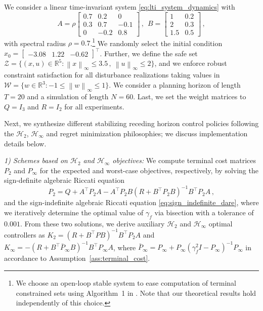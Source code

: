 \documentclass[conference]{IEEEtran}
\newcommand{\norm}[1]{\left\lVert#1\right\rVert}
\begin{document}
We consider a linear time-invariant system \eqref{eq:lti_system_dynamics} with
\begin{equation*}
    A = \rho \begin{bmatrix}
        0.7 & 0.2 & 0\\
        0.3 & 0.7 & -0.1\\
        0 & -0.2 & 0.8
    \end{bmatrix}\,, ~~
    B = \begin{bmatrix}
        1 & 0.2\\
        2 & 0.3\\
        1.5 & 0.5
    \end{bmatrix}\,,
\end{equation*}
with spectral radius $\rho = 0.7$.\footnote{We choose an open-loop stable system to ease computation of terminal constrained sets using Algorithm~1 in \cite{rakovic2005invariant}. Note that our theoretical results hold independently of this choice.} We randomly select the initial condition $x_0 = \begin{bmatrix}
    -3.08 & 1.22 & -0.62
\end{bmatrix}^\top$. Further, we define the safe set $\mathcal{Z} = \{(x, u) \in \mathbb{R}^{5} : \norm{x}_\infty \leq 3.5\,, ~ \norm{u}_\infty \leq 2\}$, and we enforce robust constraint satisfaction for all disturbance realizations taking values in $\mathcal{W} = \{w \in \mathbb{R}^3 : -1 \leq \norm{w}_\infty \leq 1\}$. We consider a planning horizon of length $T = 20$ and a simulation of length $N = 60$. Last, we set the weight matrices to $Q = I_3$ and $R = I_2$ for all experiments.

Next, we synthesize different stabilizing receding horizon control policies following the $\mathcal{H}_2$, $\mathcal{H}_\infty$ and regret minimization philosophies; we discuss implementation details below.

\emph{1) Schemes based on $\mathcal{H}_2$ and $\mathcal{H}_\infty$ objectives:} We compute terminal cost matrices $P_2$ and $P_\infty$ for the expected and worst-case objectives, respectively, by solving the sign-definite algebraic Riccati equation
\begin{equation*}
    P_2 = Q + A^\top P_2 A - A^\top P_2 B (R + B^\top P_2 B)^{-1} B^\top P_2 A\,,
\end{equation*}
and the sign-indefinite algebraic Riccati equation \eqref{eq:sign_indefinite_dare}, where we iteratively determine the optimal value of $\gamma_f$ via bisection with a tolerance of $0.001$. From these two solutions, we derive auxiliary $\mathcal{H}_2$ and $\mathcal{H}_\infty$ optimal controllers as $K_2 = (R + B^\top P B)^{-1} B^\top P_2 A$ and $K_\infty = -(R + B^\top \bar{P}_\infty B)^{-1} B^\top P_\infty A$, where $\bar{P}_\infty = P_\infty + P_\infty (\gamma_f^2 I - P_\infty)^{-1} P_\infty$ in accordance to Assumption~\ref{ass:terminal_cost}.
\end{document}
